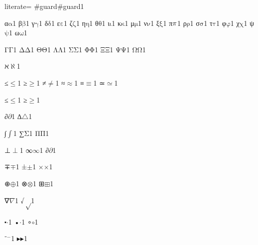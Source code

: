 {%
literate=
{\#guard}{{\color{symbolcolor}\#guard}}1

{α}{{\ensuremath{\mathrm{\alpha}}}}1
{β}{{\ensuremath{\mathrm{\beta}}}}1
{γ}{{\ensuremath{\mathrm{\gamma}}}}1
{δ}{{\ensuremath{\mathrm{\delta}}}}1
{ε}{{\ensuremath{\mathrm{\varepsilon}}}}1
{ζ}{{\ensuremath{\mathrm{\zeta}}}}1
{η}{{\ensuremath{\mathrm{\eta}}}}1
{θ}{{\ensuremath{\mathrm{\theta}}}}1
{ι}{{\ensuremath{\mathrm{\iota}}}}1
{κ}{{\ensuremath{\mathrm{\kappa}}}}1
{μ}{{\ensuremath{\mathrm{\mu}}}}1
{ν}{{\ensuremath{\mathrm{\nu}}}}1
{ξ}{{\ensuremath{\mathrm{\xi}}}}1
{π}{{\ensuremath{\mathrm{\mathnormal{\pi}}}}}1
{ρ}{{\ensuremath{\mathrm{\rho}}}}1
{σ}{{\ensuremath{\mathrm{\sigma}}}}1
{τ}{{\ensuremath{\mathrm{\tau}}}}1
{φ}{{\ensuremath{\mathrm{\varphi}}}}1
{χ}{{\ensuremath{\mathrm{\chi}}}}1
{ψ}{{\ensuremath{\mathrm{\psi}}}}1
{ω}{{\ensuremath{\mathrm{\omega}}}}1

{Γ}{{\ensuremath{\mathrm{\Gamma}}}}1
{Δ}{{\ensuremath{\mathrm{\Delta}}}}1
{Θ}{{\ensuremath{\mathrm{\Theta}}}}1
{Λ}{{\ensuremath{\mathrm{\Lambda}}}}1
{Σ}{{\ensuremath{\mathrm{\Sigma}}}}1
{Φ}{{\ensuremath{\mathrm{\Phi}}}}1
{Ξ}{{\ensuremath{\mathrm{\Xi}}}}1
{Ψ}{{\ensuremath{\mathrm{\Psi}}}}1
{Ω}{{\ensuremath{\mathrm{\Omega}}}}1

{ℵ}{{\ensuremath{\aleph}}}1

{≤}{{\ensuremath{\leq}}}1
{≥}{{\ensuremath{\geq}}}1
{≠}{{\ensuremath{\neq}}}1
{≈}{{\ensuremath{\approx}}}1
{≡}{{\ensuremath{\equiv}}}1
{≃}{{\ensuremath{\simeq}}}1

{≤}{{\ensuremath{\leq}}}1
{≥}{{\ensuremath{\geq}}}1

{∂}{{\ensuremath{\partial}}}1
{∆}{{\ensuremath{\triangle}}}1 %

{∫}{{\ensuremath{\int}}}1
{∑}{{\ensuremath{\mathrm{\Sigma}}}}1
{Π}{{\ensuremath{\mathrm{\Pi}}}}1

{⊥}{{\ensuremath{\perp}}}1
{∞}{{\ensuremath{\infty}}}1
{∂}{{\ensuremath{\partial}}}1

{∓}{{\ensuremath{\mp}}}1
{±}{{\ensuremath{\pm}}}1
{×}{{\ensuremath{\times}}}1

{⊕}{{\ensuremath{\oplus}}}1
{⊗}{{\ensuremath{\otimes}}}1
{⊞}{{\ensuremath{\boxplus}}}1

{∇}{{\ensuremath{\nabla}}}1
{√}{{\ensuremath{\sqrt}}}1

{⬝}{{\ensuremath{\cdot}}}1
{•}{{\ensuremath{\cdot}}}1
{∘}{{\ensuremath{\circ}}}1

{⁻}{{\ensuremath{^{-}}}}1
{▸}{{\ensuremath{\blacktriangleright}}}1

}
